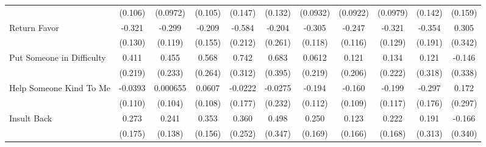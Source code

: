 {\begin{tabular}{l*{10}{c}}
            &     (0.106)         &    (0.0972)         &     (0.105)         &     (0.147)         &     (0.132)         &    (0.0932)         &    (0.0922)         &    (0.0979)         &     (0.142)         &     (0.159)         \\
\addlinespace
Return Favor&      -0.321\sym{*}  &      -0.299\sym{*}  &      -0.209         &      -0.584\sym{**} &      -0.204         &      -0.305\sym{**} &      -0.247\sym{*}  &      -0.321\sym{*}  &      -0.354         &       0.305         \\
            &     (0.130)         &     (0.119)         &     (0.155)         &     (0.212)         &     (0.261)         &     (0.118)         &     (0.116)         &     (0.129)         &     (0.191)         &     (0.342)         \\
\addlinespace
Put Someone in Difficulty&       0.411         &       0.455         &       0.568\sym{*}  &       0.742\sym{*}  &       0.683         &      0.0612         &       0.121         &       0.134         &       0.121         &      -0.146         \\
            &     (0.219)         &     (0.233)         &     (0.264)         &     (0.312)         &     (0.395)         &     (0.219)         &     (0.206)         &     (0.222)         &     (0.318)         &     (0.338)         \\
\addlinespace
Help Someone Kind To Me&     -0.0393         &    0.000655         &      0.0607         &     -0.0222         &     -0.0275         &      -0.194         &      -0.160         &      -0.199         &      -0.297         &       0.172         \\
            &     (0.110)         &     (0.104)         &     (0.108)         &     (0.177)         &     (0.232)         &     (0.112)         &     (0.109)         &     (0.117)         &     (0.176)         &     (0.297)         \\
\addlinespace
Insult Back &       0.273         &       0.241         &       0.353\sym{*}  &       0.360         &       0.498         &       0.250         &       0.123         &       0.222         &       0.191         &      -0.166         \\
            &     (0.175)         &     (0.138)         &     (0.156)         &     (0.252)         &     (0.347)         &     (0.169)         &     (0.166)         &     (0.168)         &     (0.313)         &     (0.340)         \\
\bottomrule
\end{tabular}
}
